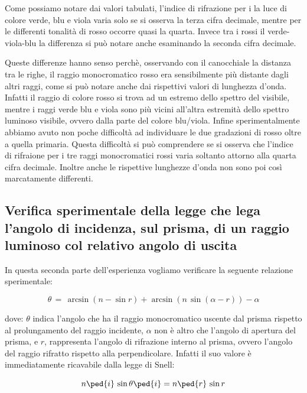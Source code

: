 Come possiamo notare dai valori tabulati, l'indice di rifrazione per i la luce di colore verde, blu e viola varia solo se si osserva la terza cifra decimale, mentre per le differenti tonalità di rosso occorre quasi la quarta. Invece tra i rossi il verde-viola-blu la differenza si può notare anche esaminando la seconda cifra decimale.

Queste differenze hanno senso perchè, osservando con il canocchiale la distanza tra le righe, il raggio monocromatico rosso era sensibilmente più distante dagli altri raggi, come si può notare anche dai rispettivi valori di lunghezza d'onda. Infatti il raggio di colore rosso si trova ad un estremo dello spettro del visibile, mentre i raggi verde blu e viola sono più vicini all'altra estremità dello spettro luminoso visibile, ovvero dalla parte del colore blu/viola. Infine sperimentalmente abbiamo avuto non poche difficoltà ad individuare le due gradazioni di rosso oltre a quella primaria. Questa difficoltà si può comprendere se si osserva che l'indice di rifraione per i tre raggi monocromatici rossi varia soltanto attorno alla quarta cifra decimale. Inoltre anche le rispettive lunghezze d'onda non sono poi così marcatamente differenti.

\subsection{Verifica sperimentale della legge che lega l'angolo di incidenza, sul prisma, di un raggio luminoso col relativo angolo di uscita}

In questa seconda parte dell'esperienza vogliamo verificare la seguente relazione sperimentale:

\begin{equation}
	\theta \,=\, \arcsin{(n - \sin{r})} + \arcsin{(n \, \sin{(\alpha - r)})} - \alpha
	\label{eq:brutta}
\end{equation}

dove: $\theta$ indica l'angolo che ha il raggio monocromatico uscente dal prisma rispetto al prolungamento del raggio incidente, $\alpha$ non è altro che l'angolo di apertura del prisma, e $r$, rappresenta l'angolo di rifrazione interno al prisma, ovvero l'angolo del raggio rifratto rispetto alla perpendicolare. Infatti il suo valore è immediatamente ricavabile dalla legge di Snell:

\begin{equation}
	 n\ped{i} \, \sin{\theta\ped{i}} = n\ped{r} \, \sin{r}
	 \label{snell}
\end{equation}

